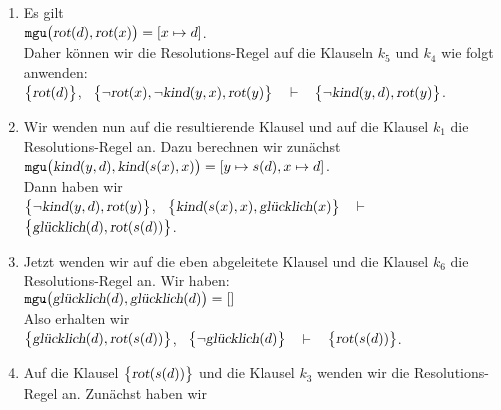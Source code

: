 \begin{enumerate}
\item Es gilt 
      \\[0.2cm]
      \hspace*{1.3cm}
      $\mathtt{mgu}\bigl(\textsl{rot}(d), \textsl{rot}(x)\bigr) = [x \mapsto d]$.
      \\[0.2cm]
      Daher können wir die Resolutions-Regel auf die Klauseln $k_5$ und $k_4$ wie folgt anwenden:
      \\[0.2cm]
      \hspace*{1.3cm}
      $\bigl\{\textsl{rot}(d)\bigl\}$, \ $\bigl\{\neg \textsl{rot}(x), \neg \textsl{kind}(y,x),
       \textsl{rot}(y)\bigl\}$ \ $\vdash$ \ $\bigl\{\neg \textsl{kind}(y,d), \textsl{rot}(y)\bigl\}$.
\item Wir wenden nun auf die resultierende Klausel und auf die Klausel $k_1$ die
      Resolutions-Regel an.  Dazu berechnen wir zunächst
      \\[0.2cm]
      \hspace*{1.3cm}
      $\mathtt{mgu}\bigl(\textsl{kind}(y,d), \textsl{kind}(s(x),x)\bigr) = 
       [y \mapsto s(d), x \mapsto d]$.
      \\[0.2cm]
      Dann haben wir
      \\[0.2cm]
      \hspace*{1.3cm}
       $\bigl\{\neg \textsl{kind}(y,d), \textsl{rot}(y)\bigl\}$, \ 
       $\bigl\{\textsl{kind}(s(x),x), \textsl{glücklich}(x)\bigl\}$ \ $\vdash$ \ 
       $\bigl\{\textsl{glücklich}(d), \textsl{rot}(s(d))\bigl\}$.
\item Jetzt wenden wir auf die eben abgeleitete Klausel und die Klausel $k_6$ die
      Resolutions-Regel an.  Wir haben:
      \\[0.2cm]
      \hspace*{1.3cm}
      $\mathtt{mgu}\bigl(\textsl{glücklich}(d), \textsl{glücklich}(d)\bigr) = []$
      \\[0.2cm]
      Also erhalten wir
      \\[0.2cm]
      \hspace*{1.3cm}
      $\bigl\{\textsl{glücklich}(d), \textsl{rot}(s(d))\bigl\}$, \ $\bigl\{\neg \textsl{glücklich}(d)\bigl\}$ \ $\vdash$ \ $\bigl\{\textsl{rot}(s(d))\bigl\}$.
\item Auf die Klausel $\bigl\{\textsl{rot}(s(d))\bigl\}$ und die Klausel $k_3$ wenden wir
      die Resolutions-Regel an.  Zunächst haben wir
      \\[0.2cm]
      \hspace*{1.3cm}

\end{enumerate}
